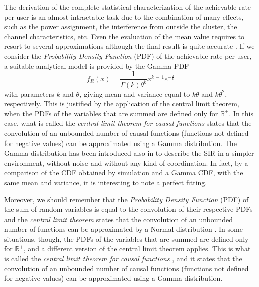 The derivation of the complete statistical characterization of the achievable rate per user is an almost intractable task due to the combination of many effects, such as the power assignment, the interference from outside the cluster, the channel characteristics, etc. Even the evaluation of the mean value requires to resort to several approximations although the final result is quite accurate \cite{corvaja13b}.
If we consider the \emph{Probability Density Function} (PDF) of the achievable rate per user, a suitable analytical model is provided by the Gamma PDF 
\begin{equation}
	f_R(x)= \scriptstyle \frac{1}{\Gamma(k) \theta^k} x^{k \,-\, 1} e^{-\frac{x}{\theta}} \label{GammaPDF}
\end{equation}
with parameters $k$ and $\theta$, giving mean and variance equal to $k\theta$ and $k\theta^2$, respectively. This is justified by the application of the central limit theorem, when the PDFs of the variables that are summed are defined only for $\mathbb{R}^{+}$. In this case, what is called the \emph{central limit theorem for causal functions} \cite{papoulis_fourier} states that the convolution of an unbounded number of causal functions (functions not defined for negative values) can be approximated using a Gamma distribution.
The Gamma distribution has been introduced also in \cite{cheikh11} to describe the SIR in a simpler environment,
without noise and without any kind of coordination.
In fact, by a comparison of the CDF obtained by simulation and a Gamma CDF, with the same mean and variance, it is interesting to note a perfect fitting.

Moreover, we should remember that the \emph{Probability Density Function} (PDF) of the sum of random variables is equal to the convolution of their respective PDFs and the \emph{central limit theorem} states that the convolution of an unbounded number of functions can be approximated by a Normal distribution \cite{papoulis_fourier}. In some situations, though, the PDFs of the variables that are summed are defined only for $\mathbb{R}^{+}$, and a different version of the central limit theorem applies. This is what is called the \emph{central limit theorem for causal functions} \cite{papoulis_fourier}, and it states that the convolution of an unbounded
number of causal functions (functions not defined for negative values) can be approximated using a Gamma distribution.

